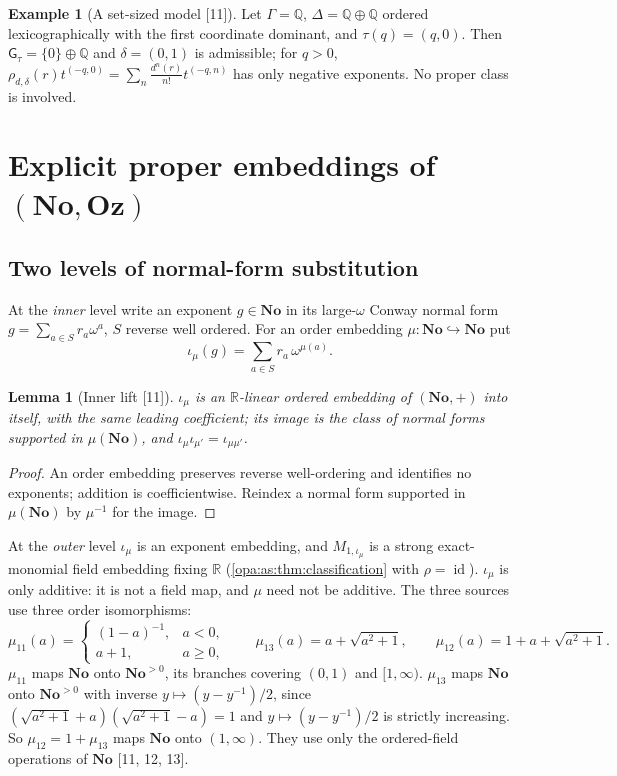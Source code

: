 \documentclass[11pt,oneside]{article}
\numberwithin{equation}{section}
\newtheorem{lemma}[lemma]{Lemma}
\theoremstyle{definition}
\newtheorem{example}[example]{Example}
\theoremstyle{remark}
\newcommand{\No}{\mathbf{No}}
\newcommand{\Oz}{\mathbf{Oz}}
\newcommand{\R}{\mathbb R}
\newcommand{\Q}{\mathbb Q}
\newcommand{\id}{\operatorname{id}}
\newcommand{\src}[1]{\textup{\textsf{\small[#1]}}}
\newcommand{\gap}{\mathsf G}
\begin{document}
\begin{example}[A set-sized model \src{11}]\label{opa:as:ex:setmodel}
Let $\Gamma=\Q$, $\Delta=\Q\oplus\Q$ ordered lexicographically with the first coordinate dominant,
and $\tau(q)=(q,0)$. Then $\gap_\tau=\{0\}\oplus\Q$ and $\delta=(0,1)$ is admissible; for $q>0$,
$\rho_{d,\delta}(r)t^{(-q,0)}=\sum_n\frac{d^n(r)}{n!}t^{(-q,n)}$ has only negative exponents. No proper
class is involved.
\end{example}

\section{Explicit proper embeddings of \texorpdfstring{$(\No,\Oz)$}{(No, Oz)}}\label{opa:as:sec:explicit}

\subsection{Two levels of normal-form substitution}

At the \emph{inner} level write an exponent $g\in\No$ in its large-$\omega$ Conway normal form
$g=\sum_{a\in S}r_a\omega^a$, $S$ reverse well ordered. For an order embedding
$\mu:\No\hookrightarrow\No$ put
\begin{equation}\label{opa:as:eq:innerlift}
 \iota_\mu(g)=\sum_{a\in S}r_a\,\omega^{\mu(a)} .
\end{equation}

\begin{lemma}[Inner lift \src{11}]\label{opa:as:lem:inner}
$\iota_\mu$ is an $\R$-linear ordered embedding of $(\No,+)$ into itself, with the same leading
coefficient; its image is the class of normal forms supported in $\mu(\No)$, and
$\iota_\mu\iota_{\mu'}=\iota_{\mu\mu'}$.
\end{lemma}
\begin{proof}
An order embedding preserves reverse well-ordering and identifies no exponents; addition is
coefficientwise. Reindex a normal form supported in $\mu(\No)$ by $\mu^{-1}$ for the image.
\end{proof}

At the \emph{outer} level $\iota_\mu$ is an exponent embedding, and $M_{1,\iota_\mu}$ is a strong
exact-monomial field embedding fixing $\R$ (\cref{opa:as:thm:classification} with $\rho=\id$).
$\iota_\mu$ is only additive: it is not a field map, and $\mu$ need not be additive. The three
sources use three order isomorphisms:
\begin{equation}\label{opa:as:eq:mus}
 \mu_{11}(a)=\begin{cases}(1-a)^{-1},&a<0,\\ a+1,&a\ge0,\end{cases}\qquad
 \mu_{13}(a)=a+\sqrt{a^2+1},\qquad
 \mu_{12}(a)=1+a+\sqrt{a^2+1}.
\end{equation}
$\mu_{11}$ maps $\No$ onto $\No^{>0}$, its branches covering $(0,1)$ and $[1,\infty)$. $\mu_{13}$ maps
$\No$ onto $\No^{>0}$ with inverse $y\mapsto(y-y^{-1})/2$, since
$(\sqrt{a^2+1}+a)(\sqrt{a^2+1}-a)=1$ and $y\mapsto(y-y^{-1})/2$ is strictly increasing. So $\mu_{12}=1+\mu_{13}$
maps $\No$ onto $(1,\infty)$. They use only the ordered-field operations of $\No$ \src{11, 12, 13}.
\end{document}
